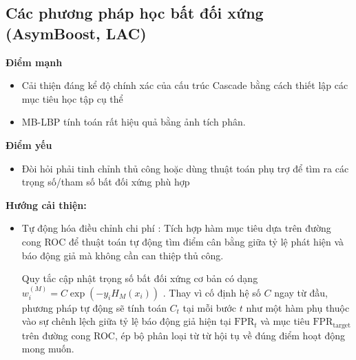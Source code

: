 \subsection{Các phương pháp học bất đối xứng (AsymBoost, LAC)}
\textbf{Điểm mạnh}
\begin{itemize}
    \item Cải thiện đáng kể độ chính xác của cấu trúc Cascade bằng cách thiết lập các mục tiêu học tập cụ thể
    \item MB-LBP tính toán rất hiệu quả bằng ảnh tích phân.
\end{itemize}
\textbf{Điểm yếu}
\begin{itemize}
    \item Đòi hỏi phải tinh chỉnh thủ công hoặc dùng thuật toán phụ trợ để tìm ra các trọng số/tham số bất đối xứng phù hợp
\end{itemize}
\textbf{Hướng cải thiện:}
\begin{itemize}
  \item Tự động hóa điều chỉnh chi phí \cite{masnadi2010design}: Tích hợp hàm mục tiêu dựa trên đường cong ROC để thuật toán tự động tìm điểm cân bằng giữa tỷ lệ phát hiện và báo động giả mà không cần can thiệp thủ công.

  Quy tắc cập nhật trọng số bất đối xứng cơ bản có dạng $w_i^{(M)} = C \exp(-y_i H_M(x_i))$ \cite{wu2008asymmetric}. Thay vì cố định hệ số $C$ ngay từ đầu, phương pháp tự động \cite{masnadi2010design} sẽ tính toán $C_t$ tại mỗi bước $t$ như một hàm phụ thuộc vào sự chênh lệch giữa tỷ lệ báo động giả hiện tại $\text{FPR}_t$ và mục tiêu $\text{FPR}_{\text{target}}$ trên đường cong ROC, ép bộ phân loại từ từ hội tụ về đúng điểm hoạt động mong muốn.
\end{itemize}

